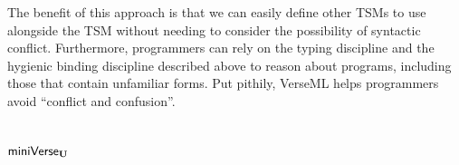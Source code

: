 The benefit of this approach is that we can easily define other TSMs to use alongside the  TSM without needing to consider the possibility of syntactic conflict. Furthermore, programmers can rely on the typing discipline and the hygienic binding discipline described above to reason about programs, including those that contain unfamiliar forms. Put pithily, VerseML helps programmers avoid ``conflict and confusion''. 


\section{$\mathsf{miniVerse}_\textbf{U}$}\label{sec:tsms-minimal-formalism}

